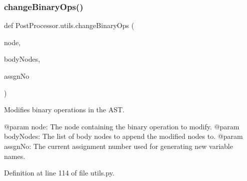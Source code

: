 \subsubsection{\texorpdfstring{change\+Binary\+Ops()}{changeBinaryOps()}}
{\footnotesize\ttfamily def Post\+Processor.\+utils.\+change\+Binary\+Ops (\begin{DoxyParamCaption}\item[{}]{node,  }\item[{}]{body\+Nodes,  }\item[{}]{assgn\+No }\end{DoxyParamCaption})}

\begin{DoxyVerb}Modifies binary operations in the AST.

@param node: The node containing the binary operation to modify.
@param bodyNodes: The list of body nodes to append the modified nodes to.
@param assgnNo: The current assignment number used for generating new variable names.
\end{DoxyVerb}
 

Definition at line 114 of file utils.\+py.


